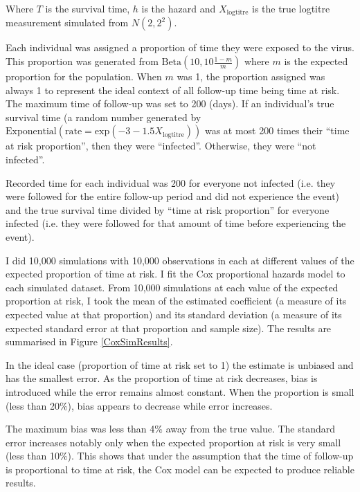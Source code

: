 \documentclass[12pt]{article}
\begin{document}
Where $T$ is the survival time, $h$ is the hazard and $X_{\text{logtitre}}$ is the true logtitre measurement simulated from $N(2, 2^2)$.

Each individual was assigned a proportion of time they were exposed to the virus. This proportion was generated from $\text{Beta}(10, 10\frac{1-m}{m})$ where $m$ is the expected proportion for the population. When $m$ was 1, the proportion assigned was always 1 to represent the ideal context of all follow-up time being time at risk. The maximum time of follow-up was set to 200 (days). If an individual's true survival time (a random number generated by $\text{Exponential}(\text{rate} = \text{exp}(-3 - 1.5 X_{\text{logtitre}}) )$ was at most 200 times their ``time at risk proportion'', then they were ``infected''. Otherwise, they were ``not infected''. 

Recorded time for each individual was 200 for everyone not infected (i.e. they were followed for the entire follow-up period and did not experience the event) and the true survival time divided by ``time at risk proportion'' for everyone infected (i.e. they were followed for that amount of time before experiencing the event).

I did 10,000 simulations with 10,000 observations in each at different values of the expected proportion of time at risk. I fit the Cox proportional hazards model to each simulated dataset. From 10,000 simulations at each value of the expected proportion at risk, I took the mean of the estimated coefficient (a measure of its expected value at that proportion) and its standard deviation (a measure of its expected standard error at that proportion and sample size). The results are summarised in Figure \ref{CoxSimResults}.

In the ideal case (proportion of time at risk set to 1) the estimate is unbiased and has the smallest error. As the proportion of time at risk decreases, bias is introduced while the error remains almost constant. When the proportion is small (less than 20\%), bias appears to decrease while error increases.

The maximum bias was less than 4\% away from the true value. The standard error increases notably only when the expected proportion at risk is very small (less than 10\%). This shows that under the assumption that the time of follow-up is proportional to time at risk, the Cox model can be expected to produce reliable results.

\pagebreak
\end{document}
